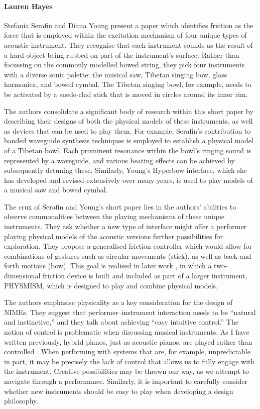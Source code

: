 \paragraph{Lauren Hayes}

Stefania Serafin and Diana Young present a paper which identifies friction as the force that is employed within the excitation mechanism of four unique types of acoustic instrument. They recognise that each instrument sounds as the result of a hard object being rubbed on part of the instrument's surface. Rather than focussing on the commonly modelled bowed string, they pick four instruments with a diverse sonic palette: the musical saw, Tibetan singing bow, glass harmonica, and bowed cymbal. The Tibetan singing bowl, for example, needs to be activated by a suede-clad stick that is moved in circles around its inner rim.

The authors consolidate a significant body of research within this short paper by describing their designs of both the physical models of these instruments, as well as devices that can be used to play them. For example, Serafin's contribution to banded waveguide synthesis techniques \cite{Essl:2004} is employed to establish a physical model of a Tibetan bowl. Each prominent resonance within the bowl's ringing sound is represented by a waveguide, and various beating effects can be achieved by subsequently detuning these. Similarly, Young's Hyperbow interface, which she has developed and revised extensively over many years, is used to play models of a musical saw and bowed cymbal. 

The crux of Serafin and Young's short paper lies in the authors' abilities to observe commonalities between the playing mechanisms of these unique instruments. They ask whether a new type of interface might offer a performer playing physical models of the acoustic versions further possibilities for exploration. They propose a generalised friction controller which would allow for combinations of gestures such as circular movements (stick), as well as back-and-forth motions (bow). This goal is realised in later work \cite{Gelineck:2010}, in which a two-dimensional friction device is built and included as part of a larger instrument, PHYSMISM, which is designed to play and combine physical models.

The authors emphasise physicality as a key consideration for the design of NIMEs. They suggest that performer--instrument interaction needs to be  ``natural and instinctive,'' and they talk about achieving ``easy intuitive control.'' The notion of control is problematic when discussing musical instruments. As I have written previously, hybrid pianos, just as acoustic pianos, are played rather than controlled \cite{Hayes:2013}. When performing with systems that are, for example, unpredictable in part, it may be precisely the lack of control that allows us to fully engage with the instrument. Creative possibilities may be thrown our way, as we attempt to navigate through a performance. Similarly, it is important to carefully consider whether new instruments should be easy to play when developing a design philosophy.

